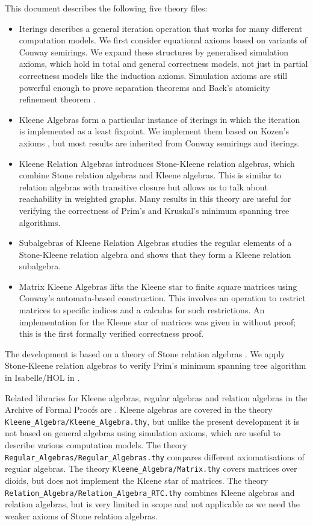 \documentclass[11pt,a4paper]{article}
\begin{document}
This document describes the following five theory files:
\begin{itemize}
\item Iterings describes a general iteration operation that works for many different computation models.
      We first consider equational axioms based on variants of Conway semirings.
      We expand these structures by generalised simulation axioms, which hold in total and general correctness models, not just in partial correctness models like the induction axioms.
      Simulation axioms are still powerful enough to prove separation theorems and Back's atomicity refinement theorem \cite{BackWright1999}.
\item Kleene Algebras form a particular instance of iterings in which the iteration is implemented as a least fixpoint.
      We implement them based on Kozen's axioms \cite{Kozen1994}, but most results are inherited from Conway semirings and iterings.
\item Kleene Relation Algebras introduces Stone-Kleene relation algebras, which combine Stone relation algebras and Kleene algebras.
      This is similar to relation algebras with transitive closure \cite{Ng1984} but allows us to talk about reachability in weighted graphs.
      Many results in this theory are useful for verifying the correctness of Prim's and Kruskal's minimum spanning tree algorithms.
\item Subalgebras of Kleene Relation Algebras studies the regular elements of a Stone-Kleene relation algebra and shows that they form a Kleene relation subalgebra.
\item Matrix Kleene Algebras lifts the Kleene star to finite square matrices using Conway's automata-based construction.
      This involves an operation to restrict matrices to specific indices and a calculus for such restrictions.
      An implementation for the Kleene star of matrices was given in \cite{Asplund2014} without proof; this is the first formally verified correctness proof.
\end{itemize}
The development is based on a theory of Stone relation algebras \cite{Guttmann2017a,Guttmann2017b}.
We apply Stone-Kleene relation algebras to verify Prim's minimum spanning tree algorithm in Isabelle/HOL in \cite{Guttmann2016c}.

Related libraries for Kleene algebras, regular algebras and relation algebras in the Archive of Formal Proofs are \cite{ArmstrongFosterStruthWeber2016,ArmstrongGomesStruthWeber2016,FosterStruth2016}.
Kleene algebras are covered in the theory \texttt{Kleene\_Algebra/Kleene\_Algebra.thy}, but unlike the present development it is not based on general algebras using simulation axioms, which are useful to describe various computation models.
The theory \texttt{Regular\_Algebras/Regular\_Algebras.thy} compares different axiomatisations of regular algebras.
The theory \texttt{Kleene\_Algebra/Matrix.thy} covers matrices over dioids, but does not implement the Kleene star of matrices.
The theory \texttt{Relation\_Algebra/Relation\_Algebra\_RTC.thy} combines Kleene algebras and relation algebras, but is very limited in scope and not applicable as we need the weaker axioms of Stone relation algebras.

\begin{flushleft}

\end{flushleft}



\end{document}
